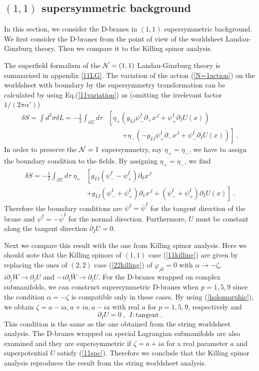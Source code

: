 \documentclass[a4paper,12pt]{article}
\numberwithin{equation}{section}
\newcommand{\del}{\partial}
\newcommand{\jb}{\bar{\jmath}}
\newcommand{\nn}{\nonumber\\}
\newcommand{\Ncal}{{\cal N}}
\begin{document}
\subsection{$(1,1)$ supersymmetric background}
\label{11D-brane}

In this section, we consider the D-branes in $(1,1)$ supersymmetric
background. We first consider the D-branes from the point of view of the
worldsheet Landau-Ginzburg theory. Then we compare it to the Killing spinor 
analysis. 

The superfield formalism of the $\Ncal=(1,1)$ Landau-Ginzburg theory is 
summarised in appendix \ref{11LG}.
The variation of the action (\ref{N=1action}) on the worldsheet with boundary
by the supersymmetry transformation can be calculated by using 
Eq.(\ref{11variation}) as (omitting the irrelevant factor $1/(2 \pi \alpha')$)
\begin{align}
 \delta S = \int d^2 \sigma \delta L
   =- \frac12 \int_{\del \Sigma} d\tau &\left[
 \eta_{+}\left(g_{IJ}\psi_{-}^{I}\del_{+} x^{J}
         + \psi_{+}^{I} \del_{I} U(x)\right) \right. \nn
 &\qquad \left. + \eta_{-}\left( - g_{IJ}\psi_{+}^{I}\del_{-} x^{J}
          + \psi_{-}^{I} \del_{I} U(x)\right)
\right]~.
\end{align}
In order to preserve the ${\cal N}=1$ supersymmetry, 
say $\eta_{+} = \eta_{-}$, 
we have to assign the boundary condition to the fields.
By assigning $\eta_{+} = \eta_{-}$, we find
\begin{align}
 \delta S = -\frac12 \int_{\del \Sigma} d\tau \;\eta_{+} &\left[
g_{IJ}(\psi_{-}^{I}-\psi_{+}^{I})\del_0  x^{J} \right. \nn
&  \left. +g_{IJ}(\psi_{-}^{I}+\psi_{+}^{I})\del_1 x^{J}
 + (\psi_{-}^{I}+\psi_{+}^{I})\del_I U(x)
\right]~.
\end{align}
Therefore the boundary conditions are
$\psi^I = \bar{\psi}^I$ for the tangent direction
of the brane and $\psi^I = - \bar{\psi}^I$ for the normal direction.
Furthermore, $U$ must be constant along the tangent direction 
$\partial_I U = 0$.

Next we compare this result with the one from Killing spinor analysis.
Here we should note that the Killing spinors of $(1,1)$ case 
(\ref{11killing}) are given by replacing the ones of $(2,2)$
case (\ref{22killing}) of $\varphi_{j\bar{k}}=0$ with 
$\alpha \to - \zeta$, $ i \partial_{j} W \to \partial_{j} U $ and
$-i \partial_{\jb} \bar{W} \to \partial_{\jb} U $.
For the D-branes wrapped on complex submanifolds,
we can construct supersymmetric D-branes when
$p=1,5,9$ since the condition $\alpha = - \zeta$ is
compatible only in these cases.
By using (\ref{holomorphic}), we obtain 
$\zeta = a - ia, a + ia, a - ia$ with real $a$ for $p =
1,5,9$, respectively and
\begin{equation}
 \partial_I U = 0 ~,~~ I : \mbox{tangent} ~.
\label{11spc}
\end{equation}
This condition is the same as the one obtained from the string worldsheet
 analysis.
The D-branes wrapped on special Lagrangian submanifolds are
 also examined and they are supersymmetric if
$\zeta =a +ia$ for a real parameter $a$
and superpotential $U$ satisfy (\ref{11spc}).
Therefore we conclude that the Killing spinor analysis reproduces the
result from the string worldsheet analysis.
\end{document}
